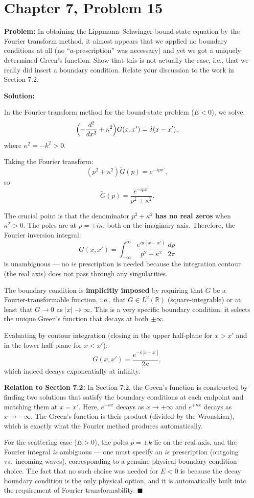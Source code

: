 \documentclass[12pt]{article}
\begin{document}
\section*{Chapter 7, Problem 15}

\textbf{Problem:} In obtaining the Lippmann--Schwinger bound-state equation by the Fourier transform method, it almost appears that we applied no boundary conditions at all (no ``$a$-prescription'' was necessary) and yet we got a uniquely determined Green's function. Show that this is not actually the case, i.e., that we really did insert a boundary condition. Relate your discussion to the work in Section 7.2.

\bigskip
\textbf{Solution:}

In the Fourier transform method for the bound-state problem ($E < 0$), we solve:
\[
\Bigl(-\frac{d^2}{dx^2} + \kappa^2\Bigr)G(x,x') = \delta(x-x'),
\]
where $\kappa^2 = -k^2 > 0$.

Taking the Fourier transform:
\[
(p^2 + \kappa^2)\tilde{G}(p) = e^{-ipx'},
\]
so
\[
\tilde{G}(p) = \frac{e^{-ipx'}}{p^2 + \kappa^2}.
\]

The crucial point is that the denominator $p^2 + \kappa^2$ \textbf{has no real zeros} when $\kappa^2 > 0$. The poles are at $p = \pm i\kappa$, both on the imaginary axis. Therefore, the Fourier inversion integral:
\[
G(x,x') = \int_{-\infty}^{\infty} \frac{e^{ip(x-x')}}{p^2 + \kappa^2}\,\frac{dp}{2\pi}
\]
is unambiguous --- no $i\epsilon$ prescription is needed because the integration contour (the real axis) does not pass through any singularities.

The boundary condition is \textbf{implicitly imposed} by requiring that $G$ be a Fourier-transformable function, i.e., that $G \in L^2(\mathbb{R})$ (square-integrable) or at least that $G \to 0$ as $|x| \to \infty$. This is a very specific boundary condition: it selects the unique Green's function that decays at both $\pm\infty$.

Evaluating by contour integration (closing in the upper half-plane for $x > x'$ and in the lower half-plane for $x < x'$):
\[
G(x,x') = \frac{e^{-\kappa|x-x'|}}{2\kappa},
\]
which indeed decays exponentially at infinity.

\textbf{Relation to Section 7.2:} In Section 7.2, the Green's function is constructed by finding two solutions that satisfy the boundary conditions at each endpoint and matching them at $x = x'$. Here, $e^{-\kappa x}$ decays as $x \to +\infty$ and $e^{+\kappa x}$ decays as $x \to -\infty$. The Green's function is their product (divided by the Wronskian), which is exactly what the Fourier method produces automatically.

For the scattering case ($E > 0$), the poles $p = \pm k$ lie on the real axis, and the Fourier integral \textit{is} ambiguous --- one must specify an $i\epsilon$ prescription (outgoing vs.\ incoming waves), corresponding to a genuine physical boundary-condition choice. The fact that no such choice was needed for $E < 0$ is because the decay boundary condition is the only physical option, and it is automatically built into the requirement of Fourier transformability. $\blacksquare$
\end{document}
